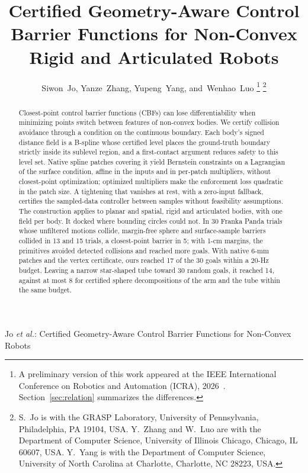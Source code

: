 \documentclass[journal]{IEEEtran}
\theoremstyle{definition}
\newif\ifanonymous
\begin{document}
\title{Certified Geometry-Aware Control Barrier Functions for Non-Convex Rigid and Articulated
Robots}

\ifanonymous
\author{Anonymous Authors}
\markboth{IEEE Transactions on Robotics}%
{Certified Geometry-Aware Control Barrier Functions for Non-Convex Robots}
\else
\author{Siwon~Jo, Yanze~Zhang, Yupeng~Yang, and~Wenhao~Luo%
\thanks{A preliminary version of this work appeared at the IEEE International Conference on
Robotics and Automation (ICRA), 2026~\cite{jo2026geometry}. Section~\ref{sec:relation}
summarizes the differences.}%
\thanks{S.~Jo is with the GRASP Laboratory, University of Pennsylvania, Philadelphia, PA 19104,
USA. Y.~Zhang and W.~Luo are with the Department of Computer Science, University of Illinois
Chicago, Chicago, IL 60607, USA. Y.~Yang is with the Department of Computer Science, University
of North Carolina at Charlotte, Charlotte, NC 28223, USA.}}

%
{Jo \MakeLowercase{\textit{et al.}}: Certified Geometry-Aware Control Barrier Functions for Non-Convex Robots}
\fi

\maketitle

\begin{abstract}
Closest-point control barrier functions (CBFs) can lose differentiability when minimizing points
switch between features of non-convex bodies. We certify collision avoidance through a condition
on the continuous boundary. Each body's signed distance field is a B-spline whose certified level
places the ground-truth boundary strictly inside its sublevel region, and a first-contact argument
reduces safety to this level set. Native spline patches covering it yield Bernstein
constraints on a Lagrangian of the surface condition, affine in the inputs and in per-patch
multipliers, without closest-point optimization; optimized multipliers make the enforcement loss
quadratic in the patch size. A tightening that vanishes at rest, with a zero-input fallback,
certifies the sampled-data controller between samples without feasibility assumptions. The
construction applies to planar and spatial, rigid and articulated bodies, with one field per body.
It docked where bounding circles could not. In 30 Franka Panda trials whose unfiltered motions
collide, margin-free sphere and surface-sample barriers collided in 13 and 15 trials, a
closest-point barrier in 5; with 1-cm margins, the primitives avoided detected collisions and reached
more goals. With native 6-mm patches and the vertex certificate, ours reached 17 of the 30 goals
within a 20-Hz budget. Leaving a narrow star-shaped tube toward 30 random goals, it reached 14,
against at most 8 for certified sphere decompositions of the arm and the tube within the same budget.
\end{abstract}
\end{document}
